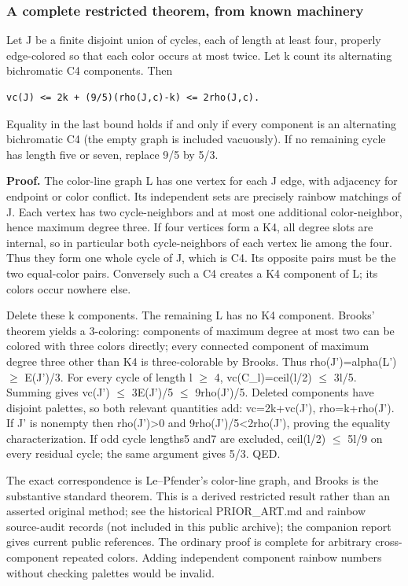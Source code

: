 \documentclass[11pt]{article}
\begin{document}
\subsubsection{A complete restricted theorem, from known machinery}\label{a-complete-restricted-theorem-from-known-machinery}

Let J be a finite disjoint union of cycles, each of length at least four, properly edge-colored so that each color occurs at most twice. Let k count its alternating bichromatic C4 components. Then

\begin{verbatim}
vc(J) <= 2k + (9/5)(rho(J,c)-k) <= 2rho(J,c).
\end{verbatim}

Equality in the last bound holds if and only if every component is an alternating bichromatic C4 (the empty graph is included vacuously). If no remaining cycle has length five or seven, replace 9/5 by 5/3.

\textbf{Proof.} The color-line graph L has one vertex for each J edge, with adjacency for endpoint or color conflict. Its independent sets are precisely rainbow matchings of J. Each vertex has two cycle-neighbors and at most one additional color-neighbor, hence maximum degree three. If four vertices form a K4, all degree slots are internal, so in particular both cycle-neighbors of each vertex lie among the four. Thus they form one whole cycle of J, which is C4. Its opposite pairs must be the two equal-color pairs. Conversely such a C4 creates a K4 component of L; its colors occur nowhere else.

Delete these k components. The remaining L has no K4 component. Brooks' theorem yields a 3-coloring: components of maximum degree at most two can be colored with three colors directly; every connected component of maximum degree three other than K4 is three-colorable by Brooks. Thus rho(J')=alpha(L') \(\ge\) \textbar E(J')\textbar/3. For every cycle of length l \(\ge\) 4, vc(C\_l)=ceil(l/2) \(\le\) 3l/5. Summing gives vc(J') \(\le\) 3\textbar E(J')\textbar/5 \(\le\) 9rho(J')/5. Deleted components have disjoint palettes, so both relevant quantities add: vc=2k+vc(J'), rho=k+rho(J'). If J' is nonempty then rho(J')\textgreater0 and 9rho(J')/5\textless2rho(J'), proving the equality characterization. If odd cycle lengths5 and7 are excluded, ceil(l/2) \(\le\) 5l/9 on every residual cycle; the same argument gives 5/3. QED.

The exact correspondence is Le--Pfender's color-line graph, and Brooks is the substantive standard theorem. This is a derived restricted result rather than an asserted original method; see the historical PRIOR\_ART.md and rainbow source-audit records (not included in this public archive); the companion report gives current public references. The ordinary proof is complete for arbitrary cross-component repeated colors. Adding independent component rainbow numbers without checking palettes would be invalid.
\end{document}
